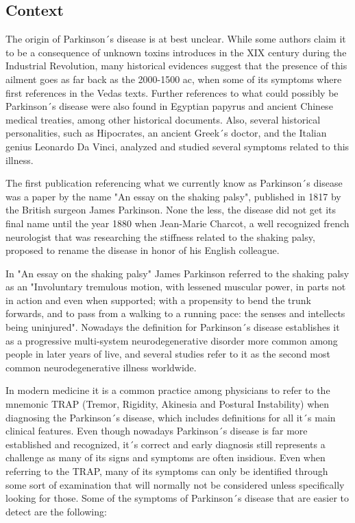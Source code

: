 \documentclass[12pt, a4paper]{article}
\begin{document}
	\subsection{Context}
	
	The origin of Parkinson´s disease is at best unclear. While some authors claim it to be a consequence of unknown toxins introduces in the XIX century during the Industrial Revolution, many historical evidences suggest that the presence of this ailment goes as far back as the 2000-1500 ac, when some of its symptoms where first references in the Vedas texts. Further references to what could possibly be Parkinson´s disease were also found in Egyptian papyrus and ancient Chinese medical treaties, among other historical documents. Also, several historical personalities, such as Hipocrates, an ancient Greek´s doctor, and the Italian genius Leonardo Da Vinci, analyzed and studied several symptoms related to this illness.
	
	The first publication referencing what we currently know as Parkinson´s disease was a paper by the name "An essay on the shaking palsy", published in 1817 by the British surgeon James Parkinson. None the less, the disease did not get its final name until the year 1880 when Jean-Marie Charcot, a well recognized french neurologist that was researching the stiffness related to the shaking palsy, proposed to rename the disease in honor of his English colleague.\cite{parkinsonhistoria}
		
	In "An essay on the shaking palsy" James Parkinson referred to the shaking palsy as an "Involuntary tremulous motion, with lessened muscular power, in parts not in action and even when supported; with a propensity to bend the trunk forwards, and to pass from a walking to a running pace: the senses and intellects being uninjured"\cite{parkinson2002essay}. Nowadays the definition for Parkinson´s disease establishes it as a progressive multi-system neurodegenerative disorder more common among people in later years of live, and several studies refer to it as the second most common neurodegenerative illness worldwide.\cite{sveinbjornsdottir2016clinical}
	
	In modern medicine it is a common practice among physicians to refer to the mnemonic TRAP (Tremor, Rigidity, Akinesia and Postural Instability) when diagnosing the Parkinson´s disease, which includes definitions for all it´s main clinical features. Even though nowadays Parkinson´s disease is far more established and recognized, it´s correct and early diagnosis still represents a challenge as many of its signs and symptoms are often insidious. Even when referring to the TRAP, many of its symptoms can only be identified through some sort of examination that will normally not be considered unless specifically looking for those. Some of the symptoms of Parkinson´s disease that are easier to detect are the following:\cite{frank2006approach}
	
\end{document}
